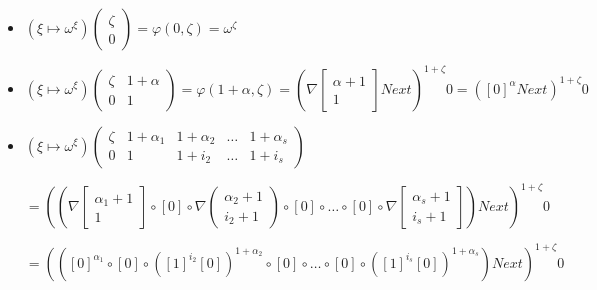 \documentclass[10pt]{article}
\begin{document}
\begin{itemize}

\item 
\( (\xi \mapsto \omega^\xi) \begin{pmatrix} \zeta \\
                                            0     \end{pmatrix} = \varphi(0,\zeta) = \omega^\zeta \)

\item 
\( (\xi \mapsto \omega^\xi) \begin{pmatrix} \zeta & 1+\alpha \\
                                            0     & 1        \end{pmatrix} = \varphi(1+\alpha,\zeta) 
= (\nabla \begin{bmatrix} \alpha+1 \\
                          1        \end{bmatrix} Next)^{1+\zeta} 0 = ([0]^\alpha Next)^{1+\zeta} 0 \)

\item 
\( (\xi \mapsto \omega^\xi) \begin{pmatrix} \zeta & 1+\alpha_1 & 1+\alpha_2 & \ldots & 1+\alpha_s \\
                                                  0     & 1          & 1+i_2      & \ldots & 1+i_s      \end{pmatrix} \)

\( = ((\nabla \begin{bmatrix} \alpha_1+1 \\
                              1          \end{bmatrix} \circ [0] \circ \nabla \begin{pmatrix} \alpha_2+1 \\
                                                                                              i_2+1      \end{pmatrix} \circ [0] \circ \ldots \circ [0] \circ \nabla \begin{bmatrix} \alpha_s+1 \\
                                                                                                                                                                                     i_s+1      \end{bmatrix}) Next)^{1+\zeta} 0 \)

\( = (([0]^{\alpha_1} \circ [0] \circ ([1]^{i_2} [0])^{1+\alpha_2} \circ [0] \circ \ldots \circ [0] \circ ([1]^{i_s} [0])^{1+\alpha_s}) Next)^{1+\zeta} 0 \) 


\end{itemize}
\end{document}

